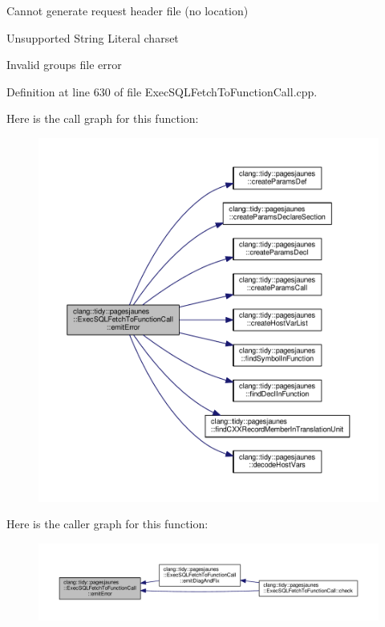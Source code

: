 Cannot generate request header file (no location)

Unsupported String Literal charset

Invalid groups file error 

Definition at line 630 of file Exec\+S\+Q\+L\+Fetch\+To\+Function\+Call.\+cpp.

Here is the call graph for this function\+:
\nopagebreak
\begin{figure}[H]
\begin{center}
\leavevmode
\includegraphics[width=350pt]{classclang_1_1tidy_1_1pagesjaunes_1_1_exec_s_q_l_fetch_to_function_call_a28043b514dd024dde394972563d78800_cgraph}
\end{center}
\end{figure}
Here is the caller graph for this function\+:
\nopagebreak
\begin{figure}[H]
\begin{center}
\leavevmode
\includegraphics[width=350pt]{classclang_1_1tidy_1_1pagesjaunes_1_1_exec_s_q_l_fetch_to_function_call_a28043b514dd024dde394972563d78800_icgraph}
\end{center}
\end{figure}
\mbox{\label{classclang_1_1tidy_1_1pagesjaunes_1_1_exec_s_q_l_fetch_to_function_call_ad9864bd77a6c6c4871bb8eb9c10ac753}} 
